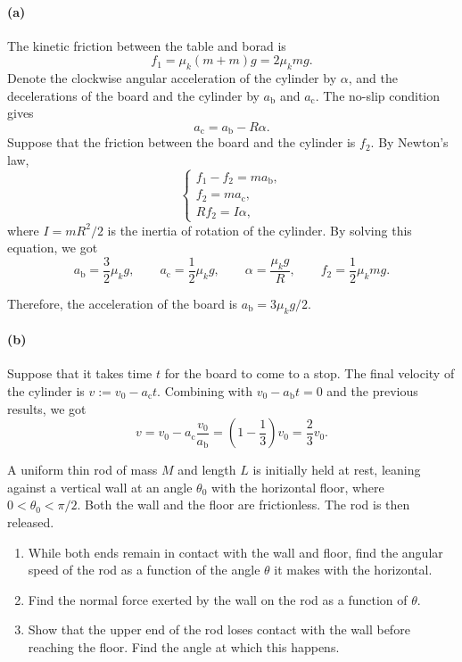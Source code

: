 \documentclass{article}
\begin{document}
\begin{solution}
	\paragraph{(a)} The kinetic friction between the table and borad is
	\[ f_1 = \mu_k (m + m)g = 2\mu_k mg. \]
	Denote the clockwise angular acceleration of the cylinder by $\alpha$, and the decelerations of the board and the cylinder by $a_{\mathrm{b}}$ and $a_{\mathrm{c}}$. The no-slip condition gives
	\[ a_{\mathrm{c}} = a_{\mathrm{b}} - R\alpha. \]
	Suppose that the friction between the board and the cylinder is $f_2$. By Newton's law, 
	\[ \begin{cases}
		f_1 - f_2 = m a_{\mathrm{b}}, \\
		f_2 = m a_{\mathrm{c}}, \\
		Rf_2 = I \alpha,
	\end{cases} \]
	where $I = mR^2/2$ is the inertia of rotation of the cylinder. By solving this equation, we got
	\[ a_{\mathrm{b}} = \frac{3}{2}\mu_k g, \qquad a_{\mathrm{c}} = \frac{1}{2}\mu_k g, \qquad \alpha = \frac{\mu_k g}{R}, \qquad f_2 = \frac{1}{2}\mu_k mg. \]
	
	Therefore, the acceleration of the board is $a_{\mathrm{b}} = 3 \mu_k g/2$.

	\paragraph{(b)} Suppose that it takes time $t$ for the board to come to a stop. The final velocity of the cylinder is $v := v_0 - a_{\mathrm{c}}t$. Combining with $v_0 - a_{\mathrm{b}} t = 0$ and the previous results, we got 
	\[ v = v_0 - a_{\mathrm{c}}\frac{v_0}{a_{\mathrm{b}}} = \left(1 - \frac{1}{3}\right)v_0 = \frac{2}{3}v_0. \]
\end{solution}



\begin{problem}
A uniform thin rod of mass $M$ and length $L$ is initially held at rest, leaning against a vertical wall at an angle $\theta_0$ with the horizontal floor, where $0<\theta_0<\pi/2$. Both the wall and the floor are frictionless. The rod is then released.
\begin{enumerate}
  \item[(a)] While both ends remain in contact with the wall and floor, find the angular speed of the rod as a function of the angle $\theta$ it makes with the horizontal.
  \item[(b)] Find the normal force exerted by the wall on the rod as a function of $\theta$.
  \item[(c)] Show that the upper end of the rod loses contact with the wall before reaching the floor. Find the angle at which this happens.
\end{enumerate}
\end{problem}
\end{document}
